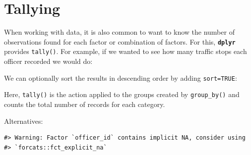 \documentclass[]{book}
\newenvironment{Shaded}{\begin{snugshade}}{\end{snugshade}}
\newcommand{\CommentTok}[1]{\textcolor[rgb]{0.56,0.35,0.01}{\textit{#1}}}
\newcommand{\DataTypeTok}[1]{\textcolor[rgb]{0.13,0.29,0.53}{#1}}
\newcommand{\KeywordTok}[1]{\textcolor[rgb]{0.13,0.29,0.53}{\textbf{#1}}}
\newcommand{\NormalTok}[1]{#1}
\newcommand{\OperatorTok}[1]{\textcolor[rgb]{0.81,0.36,0.00}{\textbf{#1}}}
\newcommand{\OtherTok}[1]{\textcolor[rgb]{0.56,0.35,0.01}{#1}}
\newcommand{\StringTok}[1]{\textcolor[rgb]{0.31,0.60,0.02}{#1}}
\begin{document}
\hypertarget{tallying}{%
\section{Tallying}\label{tallying}}

When working with data, it is also common to want to know the number of
observations found for each factor or combination of factors. For this, \textbf{\texttt{dplyr}}
provides \texttt{tally()}. For example, if we wanted to see how many traffic stops each officer recorded we would do:

\begin{Shaded}
\end{Shaded}

We can optionally sort the results in descending order by adding \texttt{sort=TRUE}:

\begin{Shaded}
\end{Shaded}

Here, \texttt{tally()} is the action applied to the groups created by \texttt{group\_by()} and counts the total number of records for each category.

Alternatives:

\begin{Shaded}
\end{Shaded}

\begin{verbatim}
#> Warning: Factor `officer_id` contains implicit NA, consider using
#> `forcats::fct_explicit_na`
\end{verbatim}
\end{document}
